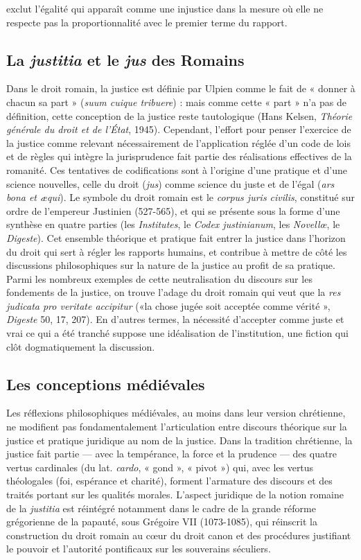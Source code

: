 %
 exclut l'égalité qui apparaît
comme une injustice dans la mesure où
elle ne respecte pas la proportionnalité
avec le premier terme du rapport.

\subsection{La {\it justitia} et le {\it jus} des Romains}

Dans le droit romain, la justice est définie par Ulpien comme le fait de « donner
à chacun sa part » ({\it suum cuique tribuere}) :
mais comme cette « part » n’a pas de définition, cette conception de la justice reste
tautologique (Hans Kelsen, {\it Théorie générale du droit et de l’État}, 1945). Cependant, l’effort pour penser l’exercice de la
justice comme relevant nécessairement de
l'application réglée d’un code de lois et
de règles qui intègre la jurisprudence fait
partie des réalisations effectives de la
romanité. Ces tentatives de codifications
sont à l’origine d’une pratique et d’une
science nouvelles, celle du droit ({\it jus})
comme science du juste et de l’égal ({\it ars bona et æqui}). Le symbole du droit
romain est le {\it corpus juris civilis}, constitué
sur ordre de l’empereur Justinien (527-565), et qui se présente sous la forme
d’une synthèse en quatre parties (les {\it Institutes}, le {\it Codex justinianum}, les {\it Novell{\oe}},
le {\it Digeste}). Cet ensemble théorique et
pratique fait entrer la justice dans l’horizon du droit qui sert à régler les rapports
humains, et contribue à mettre de côté les
discussions philosophiques sur la nature
de la justice au profit de sa pratique.
Parmi les nombreux exemples de cette
neutralisation du discours sur les fondements de la justice, on trouve l’adage du
droit romain qui veut que la {\it res judicata pro veritate accipitur} («la chose jugée soit
acceptée comme vérité », {\it Digeste} 50, 17,
207). En d’autres termes, la nécessité
d'accepter comme juste et vrai ce qui a
été tranché suppose une idéalisation de
l'institution, une fiction qui clôt dogmatiquement la discussion.

\subsection{Les conceptions médiévales}

Les réflexions philosophiques médiévales,
au moins dans leur version chrétienne, ne
modifient pas fondamentalement l’articulation entre discours théorique sur la justice et pratique juridique au nom de la
justice. Dans la tradition chrétienne, la
justice fait partie — avec la tempérance, la
force et la prudence — des quatre vertus
cardinales (du lat. {\it cardo}, « gond », « pivot ») qui, avec les vertus théologales (foi,
espérance et charité), forment l’armature
des discours et des traités portant sur les
%
qualités morales. L'aspect juridique de la
notion romaine de la {\it justitia} est réintégré
notamment dans le cadre de la grande
réforme grégorienne de la papauté, sous
Grégoire VII (1073-1085), qui réinscrit la
construction du droit romain au cœur du
droit canon et des procédures justifiant le
pouvoir et l'autorité pontificaux sur les
souverains séculiers.

